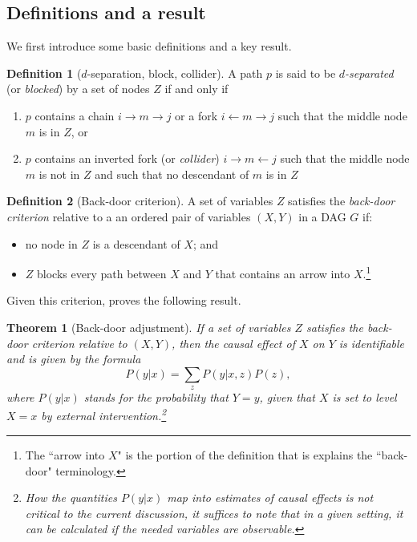 \documentclass[12pt,reqno,titlepage]{amsart}
\newtheorem{theorem}{Theorem}
\theoremstyle{definition}
\newtheorem{definition}{Definition}
\begin{document}
 \subsection{Definitions and a result}
 We first introduce some basic definitions and a key result.
 
\begin{definition}[$d$-separation, block, collider]
A path $p$ is said to be \emph{$d$-separated} (or \emph{blocked}) by a set of nodes $Z$ if and only if
\begin{enumerate}
	\item $p$ contains a chain $i \rightarrow m \rightarrow j$ or a fork $i \leftarrow m \rightarrow j$ such that the middle node $m$ is in $Z$, or
	\item $p$ contains an inverted fork (or \emph{collider}) $i \rightarrow m \leftarrow j$ such that the middle node $m$ is not in $Z$ and such that no descendant of $m$ is in $Z$
\end{enumerate}
\end{definition}

\begin{definition}[Back-door criterion]
A set of variables $Z$ satisfies the \emph{back-door criterion} relative to a an ordered pair of variables $(X, Y)$ in a 
	DAG $G$ if:
	\begin{itemize}
		\item no node in $Z$ is a descendant of $X$; and
		\item $Z$ blocks every path between $X$ and $Y$ that contains an arrow into $X$.\footnote{The ``arrow into $X$" is the portion of the definition that is explains the ``back-door" terminology.}
	\end{itemize}
\end{definition}%
Given this criterion, \citet[p.\,79]{Pearl:2009vo} proves the following result.
%
\begin{theorem}[Back-door adjustment]
	If a set of variables $Z$ satisfies the back-door criterion relative to $(X, Y)$, then the causal effect of $X$ on $Y$ is identifiable and is given by the formula 
	\[ P(y | x) = \sum_{z} P(y | x, z) P(z), \]
where $P(y|x)$ stands for the probability that $Y = y$, given that $X$ is set to level $X=x$ by external intervention.\footnote{
How the quantities $P(y|x)$ map into estimates of causal effects is not critical to the current discussion, it suffices to note that in a given setting, it can be calculated if the needed variables are observable.}
\end{theorem}
%
\end{document}
